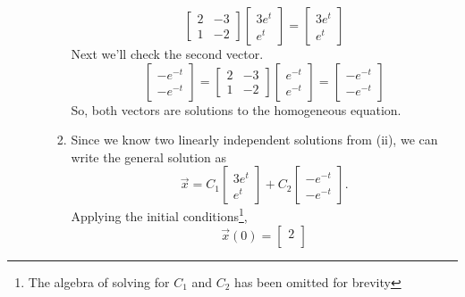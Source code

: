 \begin{enumerate}[label=\arabic*.]
\begin{enumerate}[label=(\alph*)]
\begin{enumerate}[label=(\roman*)]
\begin{equation*}
\begin{bmatrix}
									2 & -3 \\
									1 & -2
								\end{bmatrix} \begin{bmatrix}
									3e^t \\
									e^t
								\end{bmatrix} = \begin{bmatrix}
									3e^t \\
									e^t
								\end{bmatrix}
							\end{equation*}
							Next we'll check the second vector.
							\begin{equation*}
								\begin{bmatrix}
									-e^{-t} \\
									-e^{-t}
								\end{bmatrix} = \begin{bmatrix}
									2 & -3 \\
									1 & -2
								\end{bmatrix} \begin{bmatrix}
									e^{-t} \\
									e^{-t}
								\end{bmatrix} = \begin{bmatrix}
									-e^{-t} \\
									-e^{-t}
								\end{bmatrix} 
							\end{equation*}
							So, both vectors are solutions to the homogeneous equation.
						\item
							Since we know two linearly independent solutions from (ii), we can write the general solution as
							\begin{equation*}
								\vec{x} = C_1 \begin{bmatrix}
									3e^t \\
									e^t
								\end{bmatrix} + C_2 \begin{bmatrix}
									-e^{-t} \\
									-e^{-t}
								\end{bmatrix}. 
							\end{equation*}
							Applying the initial conditions\footnote{The algebra of solving for $C_1$ and $C_2$ has been omitted for brevity},
							\begin{equation*}
								\vec{x}(0) = \begin{bmatrix}
									2 \\

\end{bmatrix}
\end{equation*}
\end{enumerate}
\end{enumerate}
\end{enumerate}
